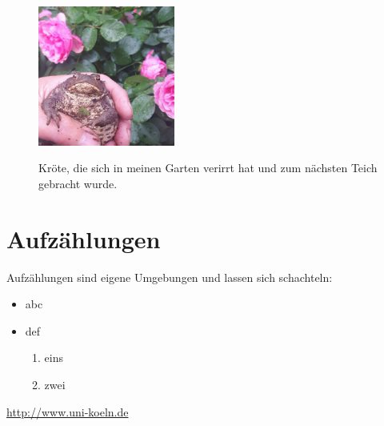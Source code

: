 \Blindtext

\begin{figure}[p]
\begin{center}
\includegraphics[width=0.4\textwidth]{img/toad}
\label{kroete}
\caption[Kurztitel Kröte]{Kröte, die sich in meinen Garten verirrt hat und zum nächsten Teich gebracht wurde.}
\end{center}
\end{figure}

\Blindtext




\section{Aufzählungen}

Aufzählungen sind eigene Umgebungen und lassen sich schachteln:

\begin{itemize}
\item abc
\item def  \begin{enumerate}
\item eins
\item zwei
\end{enumerate}
\end{itemize}






\url{http://www.uni-koeln.de}

